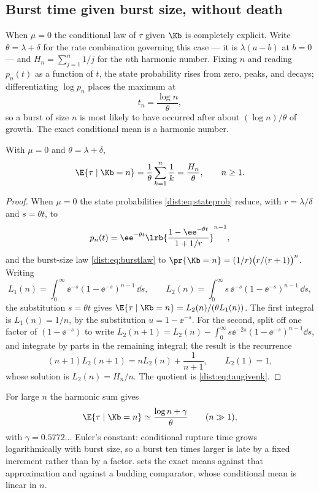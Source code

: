 \subsection{Burst time given burst size, without death}
\label{dist:sec:tau-given-k}

When $\mu=0$ the conditional law of $\tau$ given $\Kb$ is completely
explicit. Write $\theta=\lambda+\delta$ for the rate combination governing
this case --- it is $\lambda(a-b)$ at $b=0$ --- and $H_n=\sum_{j=1}^n1/j$ for
the $n$th harmonic number. Fixing $n$ and reading $p_n(t)$ as a function of
$t$, the state probability rises from zero, peaks, and decays; differentiating
$\log p_n$ places the maximum at
\begin{equation}
t_n=\frac{\log n}{\theta},
\label{dist:eq:tn}
\end{equation}
so a burst of size $n$ is most likely to have occurred after about
$(\log n)/\theta$ of growth. The exact conditional mean is a harmonic number.

\begin{proposition}[Conditional rupture time, $\mu=0$]
\label{dist:prop:taugivenk}
With $\mu=0$ and $\theta=\lambda+\delta$,
\begin{equation}
\E{\tau\mid\Kb=n}=\frac{1}{\theta}\sum_{k=1}^{n}\frac{1}{k}
=\frac{H_n}{\theta},
\qquad n\ge1.
\label{dist:eq:taugivenk}
\end{equation}
\end{proposition}

\begin{proof}
When $\mu=0$ the state probabilities \cref{dist:eq:stateprob} reduce, with
$r=\lambda/\delta$ and $s=\theta t$, to
\[
p_n(t)=\ee^{-\theta t}\lrb{\frac{1-\ee^{-\theta t}}{1+1/r}}^{n-1},
\]
and the burst-size law \cref{dist:eq:burstlaw} to
$\pr{\Kb=n}=(1/r)\bigl(r/(r+1)\bigr)^n$. Writing
\[
L_1(n)=\int_0^\infty \ee^{-s}(1-\ee^{-s})^{n-1}\,\dd s,\qquad
L_2(n)=\int_0^\infty s\,\ee^{-s}(1-\ee^{-s})^{n-1}\,\dd s,
\]
the substitution $s=\theta t$ gives
$\E{\tau\mid\Kb=n}=L_2(n)/(\theta L_1(n))$. The first integral is
$L_1(n)=1/n$, by the substitution $u=1-\ee^{-s}$. For the second, split off
one factor of $(1-\ee^{-s})$ to write
$L_2(n+1)=L_2(n)-\int_0^\infty s\ee^{-2s}(1-\ee^{-s})^{n-1}\dd s$, and
integrate by parts in the remaining integral; the result is the recurrence
\[
(n+1)L_2(n+1)=nL_2(n)+\frac{1}{n+1},\qquad L_2(1)=1,
\]
whose solution is $L_2(n)=H_n/n$. The quotient is
\cref{dist:eq:taugivenk}.
\end{proof}

For large $n$ the harmonic sum gives
\begin{equation}
\E{\tau\mid\Kb=n}\simeq\frac{\log n+\gamma}{\theta}\qquad(n\gg1),
\label{dist:eq:taugivenkasymp}
\end{equation}
with $\gamma=0.5772\ldots$ Euler's constant: conditional rupture time grows
logarithmically with burst size, so a burst ten times larger is late by a
fixed increment rather than by a factor.  sets the
exact means against that approximation and against a budding comparator, whose
conditional mean is linear in $n$.

